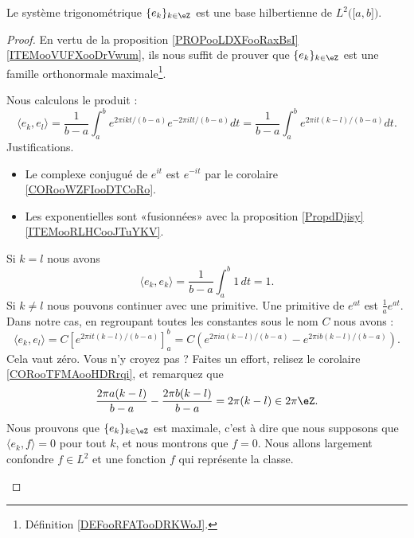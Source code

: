 \begin{theorem}       \label{THOooAVWIooDhnjpN}
	Le système trigonométrique \( \{ e_k \}_{k\in \eZ}\) est une base hilbertienne de \( L^2\big( \mathopen[ a , b \mathclose] \big)\).
\end{theorem}

\begin{proof}
	En vertu de la proposition \ref{PROPooLDXFooRaxBsI}\ref{ITEMooVUFXooDrVwum}, ils nous suffit de prouver que \( \{ e_k \}_{k\in \eZ}\) est une famille orthonormale maximale\footnote{Définition \ref{DEFooRFATooDRKWoJ}.}.

	\begin{subproof}
		\spitem[Orthonormale]
		Nous calculons le produit :
		\begin{equation}
			\langle e_k, e_l\rangle =\frac{1}{ b-a }\int_a^b e^{2\pi i kt/(b-a)} e^{-2\pi i lt/(b-a)}dt
			=\frac{1}{ b-a }\int_a^b e^{2\pi i t(k-l)/(b-a)}dt.
		\end{equation}
		Justifications.
		\begin{itemize}
			\item
			      Le complexe conjugué de \(  e^{it}\) est \(  e^{-it}\) par le corolaire \ref{CORooWZFIooDTCoRo}.
			\item
			      Les exponentielles sont «fusionnées» avec la proposition \ref{PropdDjisy}\ref{ITEMooRLHCooJTuYKV}.
		\end{itemize}
		Si \( k=l\) nous avons
		\begin{equation}
			\langle e_k, e_k\rangle =\frac{1}{ b-a }\int_a^b1\,dt=1.
		\end{equation}
		Si \( k\neq l\) nous pouvons continuer avec une primitive. Une primitive de \(  e^{at}\) est \( \frac{1}{ a } e^{at}\). Dans notre cas, en regroupant toutes les constantes sous le nom \( C\) nous avons :
		\begin{equation}
			\langle e_k, e_l\rangle =C\left[   e^{2\pi it(k-l)/(b-a)} \right]_a^b=C\left(  e^{2\pi i a(k-l)/(b-a)}- e^{2\pi i b(k-l)/(b-a)} \right).
		\end{equation}
		Cela vaut zéro. Vous n'y croyez pas ? Faites un effort, relisez le corolaire \ref{CORooTFMAooHDRrqi}, et remarquez que
		\begin{equation}
			\frac{ 2\pi a(k-l) }{ b-a }-\frac{ 2\pi b(k-l) }{ b-a }=2\pi (k-l)\in 2\pi \eZ.
		\end{equation}
		\spitem[Maximale]
		Nous prouvons que \( \{ e_k \}_{k\in \eZ}\) est maximale, c'est à dire que nous supposons que \( \langle e_k, f\rangle =0\) pour tout \( k\), et nous montrons que \( f=0\). Nous allons largement confondre \( f\in L^2\) et une fonction \( f\) qui représente la classe.


\end{subproof}
\end{proof}
